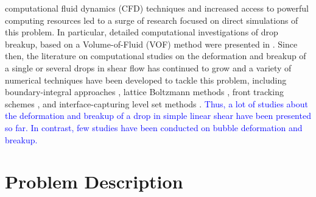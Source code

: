 \documentclass{elsarticle}
\begin{document}
{computational fluid dynamics (CFD) techniques and increased access to powerful computing resources led to a surge of research focused 
on direct simulations of this problem.  In particular, detailed computational investigations of drop breakup, based on a Volume-of-Fluid (VOF) 
method \cite{HirNic81} were presented in \cite{LiRenRen00, RenCri01-1, RenCri01-2, RenCriLi02,KhiRenCri03,Ren06,Ren07,Ren08-2}. 
Since then, the literature on computational studies on the deformation and breakup of a single or several drops in shear flow has continued 
to grow \cite{CriGuiAlfBlaLoe03, InaTomOgi03,ZhaMikBan06, BazAndMei06, JanAnd08, CroGriSch10,KomShaEskDer14,KomShaEskDer15, 
IoaLiuZha16, HerRan17,AmaBalCasOli19, ZhaShuGuaYan21} and a variety of numerical techniques have been developed to tackle this 
problem, including boundary-integral approaches \cite{CriBlaLoe01, JanAnd07}, lattice Boltzmann methods \cite{Ina06, KomShaEskDer14}, 
front tracking schemes \cite{UnvTry92}, and interface-capturing level set methods \cite{SusSmeOsh94}.
\textcolor{blue} 
{
Thus, a lot of studies about the deformation and breakup of a drop in simple linear shear have been presented so far. In contrast, few
 studies have been conducted on bubble deformation and breakup.
 }
}
\section{Problem Description}
\end{document}
